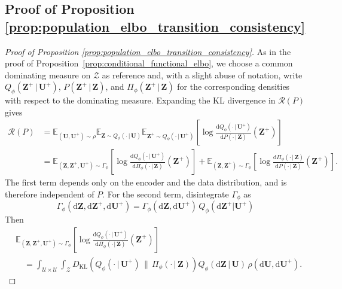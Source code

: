 \documentclass[11pt]{article}
\renewcommand{\d}{\mathrm{d}}
\begin{document}
\subsection{Proof of Proposition \ref{prop:population_elbo_transition_consistency}}
\begin{proof}[Proof of Proposition \ref{prop:population_elbo_transition_consistency}]
As in the proof of Proposition~\ref{prop:conditional_functional_elbo},
we choose a common dominating measure on $\mathcal Z$ as reference and, with a slight abuse of notation, write
$Q_\phi(\mathbf Z^+\,|\, \mathbf U^+)$,
$P(\mathbf Z^+\,|\, \mathbf Z)$, and
$\Pi_\phi(\mathbf Z^+\,|\, \mathbf Z)$ for the corresponding densities with respect to the dominating measure. Expanding the KL divergence in
$\mathcal R(P)$ gives
\begin{equation*}
\begin{aligned}
\mathcal R(P)&=
\mathbb E_{(\mathbf U,\mathbf U^+)\sim\rho}
\mathbb E_{\mathbf Z\sim Q_\phi(\cdot\,|\,\mathbf U)}
\mathbb E_{\mathbf Z^+\sim Q_\phi(\cdot\,|\,\mathbf U^+)}
\left[\log
\frac{\d Q_\phi(\cdot\,|\,\mathbf U^+)
}{\d P(\cdot\,|\,\mathbf Z)}
(\mathbf Z^+)\right]
\\
&=\mathbb E_{(\mathbf Z,\mathbf Z^+,\mathbf{U}^+)\sim\Gamma_\phi}
\left[
\log \frac{\d Q_\phi(\cdot\,|\,\mathbf U^+)}{\d\Pi_\phi(\cdot\,|\,\mathbf{Z})}(\mathbf Z^+)
\right]+
\mathbb E_{(\mathbf Z,\mathbf Z^+)\sim\Gamma_\phi}
\left[
\log\frac{\d\Pi_\phi(\cdot\,|\,\mathbf{Z})}{\d P(\cdot\,|\,\mathbf Z)}(\mathbf Z^+)
\right].
\end{aligned}
\end{equation*}
The first term depends only on the encoder and the data distribution, and is therefore independent of $P$. For the second term, disintegrate $\Gamma_\phi$ as
\[
\Gamma_\phi(\d\mathbf Z,\d\mathbf Z^+,\d\mathbf{U}^+)=
\Gamma_\phi(\d\mathbf{Z},\d\mathbf{U}^+)\,Q_\phi(\d\mathbf{Z}^+|\mathbf{U}^+)
\]
Then
\begin{equation}
\begin{aligned}
&\mathbb E_{(\mathbf Z,\mathbf Z^+,\mathbf{U}^+)\sim\Gamma_\phi}
\left[
\log \frac{\d Q_\phi(\cdot\,|\,\mathbf U^+)}{\d \Pi_\phi(\cdot\,|\,\mathbf{Z})}(\mathbf Z^+)
\right]\\
&\quad=\int_{\mathcal{U}\times\mathcal{U}}\int_\mathcal{Z} D_\mathrm{KL}\left(Q_\phi(\cdot\,|\,\mathbf{U}^+)\,\|\,\Pi_\phi(\cdot\,|\,\mathbf{Z})\right) Q_\phi(\d\mathbf{Z}\,|\,\mathbf{U})\,\rho(\d\mathbf{U},\d\mathbf{U}^+).
\end{aligned}\label{eq:elbokldecompaux1}
\end{equation}

\end{proof}
\end{document}
